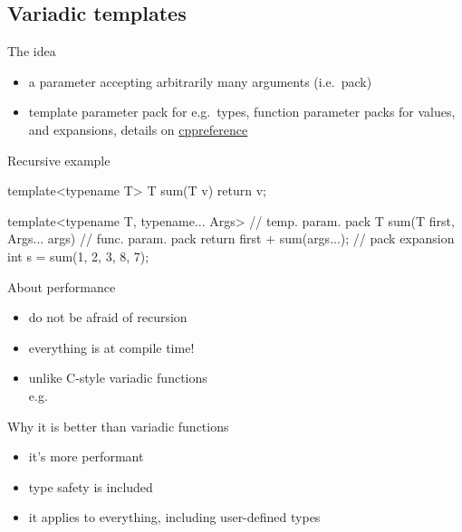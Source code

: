 \subsection[tmpl]{Variadic templates}


\begin{frame}[fragile]
  \begin{block}{The idea}
    \begin{itemize}
    \item a parameter accepting arbitrarily many arguments (i.e.\ pack)
    \item template parameter pack for e.g.\ types, function parameter packs for values, and expansions, details on \href{https://en.cppreference.com/w/cpp/language/parameter_pack}{cppreference}
    \end{itemize}
  \end{block}
  \begin{exampleblock}{Recursive example }
    \begin{cppcode*}{}
      template<typename T>
      T sum(T v) { return v; }

      template<typename T,
               typename... Args>     // temp. param. pack
      T sum(T first, Args... args) { // func. param. pack
        return first + sum(args...); // pack expansion
      }
      int s = sum(1, 2, 3, 8, 7);
    \end{cppcode*}
  \end{exampleblock}
\end{frame}

\begin{frame}
  \begin{block}{About performance}
    \begin{itemize}
    \item do not be afraid of recursion
    \item everything is at compile time!
    \item unlike C-style variadic functions \\
          e.g.\ 
    \end{itemize}
  \end{block}
  \begin{block}{Why it is better than variadic functions}
    \begin{itemize}
    \item it's more performant
    \item type safety is included
    \item it applies to everything, including user-defined types
    \end{itemize}
  \end{block}
\end{frame}


